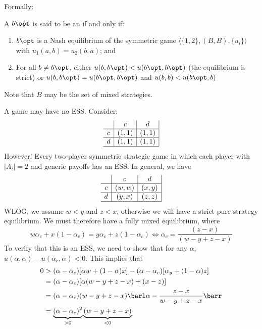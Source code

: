 \documentclass[10pt]{article}
\begin{document}
Formally:
\begin{definition}
	A $b\opt$ is said to be an  if and only if:
	\begin{enumerate}
		\item $b\opt$ is a Nash equilibrium of the symmetric game $\langle \{1,2\},(B,B),\{u_i\}\rangle$ with $u_1(a,b) = u_2(b,a)$; and
		\item For all $b\ne b\opt$, either $u(b,b\opt) < u(b\opt,b\opt)$ (\ie the equilibrium is strict) or $u(b,b\opt) = u(b\opt,b\opt)$ and $u(b,b) < u(b\opt,b)$
	\end{enumerate}
	Note that $B$ may be the set of mixed strategies.
\end{definition}

\begin{remark}
	A game may have no ESS. Consider:
	\[
	\begin{array}{c|c|c|}
		& c & d \\\hline 
		c & (1,1) & (1,1) \\\hline 
		d & (1,1) & (1,1) \\\hline
	\end{array}
	\]
	However! Every two-player symmetric strategic game in which each player with $|A_i| = 2$ and generic payoffs has an ESS. In general, we have 
	\[
	\begin{array}{c|c|c|}
		& c & d \\\hline 
		c & (w,w) & (x,y) \\\hline 
		d & (y,x) & (z,z) \\\hline
	\end{array}
	\]
	WLOG, we assume $w < y$ and $z < x$, otherwise we will have a strict pure strategy equilibrium. We must therefore have a fully mixed equilibrium, where\[w\alpha_c + x(1-\alpha_c) = y\alpha_c + z(1-\alpha_c)\Longleftrightarrow \alpha_c = \frac{(z-x)}{(w-y+z-x)}\] To verify that this is an ESS, we need to show that for any $\alpha$, $u(\alpha,\alpha) - u(\alpha_c,\alpha) < 0$. This implies that \begin{align*} 0 &> (\alpha - \alpha_c)[\alpha w + (1-\alpha)x] - (\alpha - \alpha_c)[\alpha_y + (1-\alpha)z] \\ &= (\alpha - \alpha_c)[\alpha(w - y + z - x) + (x-z)] \\ &= (\alpha - \alpha_c)(w-y+z-x)\barl \alpha - \frac{z-x}{w-y+z-x}\barr \\ &= \underbrace{(\alpha - \alpha_c)^2}_{>0} \underbrace{(w-y+z-x)}_{<0}\end{align*}
\end{remark}
\end{document}
